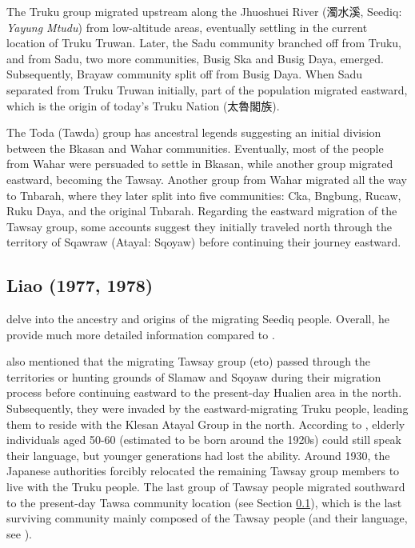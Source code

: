 The Truku group migrated upstream along the Jhuoshuei River (濁水溪, Seediq: \textit{Yayung Mtudu}) from low-altitude areas, eventually settling in the current location of Truku Truwan. Later, the Sadu community branched off from Truku, and from Sadu, two more communities, Busig Ska and Busig Daya, emerged. Subsequently, Brayaw community split off from Busig Daya. When Sadu separated from Truku Truwan initially, part of the population migrated eastward, which is the origin of today's Truku Nation (太魯閣族).

The Toda (Tawda) group has ancestral legends suggesting an initial division between the Bkasan and Wahar communities. Eventually, most of the people from Wahar were persuaded to settle in Bkasan, while another group migrated eastward, becoming the Tawsay. Another group from Wahar migrated all the way to Tnbarah, where they later split into five communities: Cka, Bngbung, Rucaw, Ruku Daya, and the original Tnbarah. Regarding the eastward migration of the Tawsay group, some accounts suggest they initially traveled north through the territory of Sqawraw (Atayal: Sqoyaw) before continuing their journey eastward.


\subsection{Liao (1977, 1978)}

\textcite{liao1977Sedtheruy,liao1978Sedtheruy}  delve into the ancestry and origins of the migrating Seediq people. Overall, he provide much more detailed information compared to \textcite{utsurikawaetal1935}.

\textcite{liao1977Sedtheruy} also mentioned that the migrating Tawsay group (\acl{eto}) passed through the territories or hunting grounds of Slamaw and Sqoyaw during their migration process before continuing eastward to the present-day Hualien area in the north. Subsequently, they were invaded by the eastward-migrating Truku people, leading them to reside with the Klesan Atayal Group in the north. According to \textcite[65]{liao1977Sedtheruy}, elderly individuals aged 50-60 (estimated to be born around the 1920s) could still speak their language, but younger generations had lost the ability. Around 1930, the Japanese authorities forcibly relocated the remaining Tawsay group members to live with the Truku people. The last group of Tawsay people migrated southward to the present-day Tawsa community location (see Section \ref{}), which is the last surviving community mainly composed of the Tawsay people (and their language, see \cite{lee2015tawsa}).

